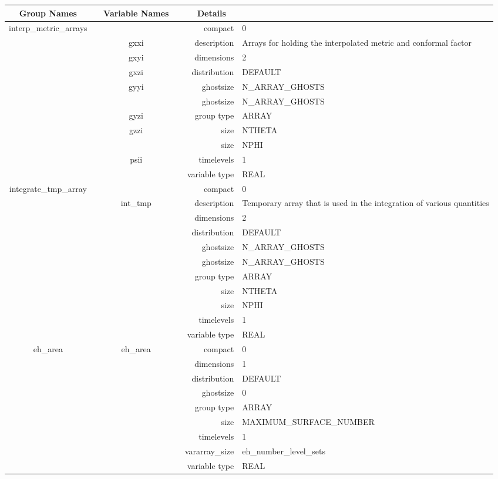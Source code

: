 \begin{tabular*}{150mm}{|c|c@{\extracolsep{\fill}}|rl|} \hline 
~ {\bf Group Names} ~ & ~ {\bf Variable Names} ~  &{\bf Details} ~ & ~ \\ 
\hline 
interp\_metric\_arrays &  & compact & 0 \\ 
 & gxxi & description & Arrays for holding the interpolated metric and conformal factor \\ 
 & gxyi & dimensions & 2 \\ 
 & gxzi & distribution & DEFAULT \\ 
 & gyyi & ghostsize & N\_ARRAY\_GHOSTS \\ 
& ~ & ghostsize & N\_ARRAY\_GHOSTS \\ 
 & gyzi & group type & ARRAY \\ 
 & gzzi & size & NTHETA \\ 
& ~ & size & NPHI \\ 
 & psii & timelevels & 1 \\ 
 &  & variable type & REAL \\ 
\hline 
integrate\_tmp\_array &  & compact & 0 \\ 
 & int\_tmp & description & Temporary array that is used in the integration of various quantities \\ 
 &  & dimensions & 2 \\ 
 &  & distribution & DEFAULT \\ 
 &  & ghostsize & N\_ARRAY\_GHOSTS \\ 
& ~ & ghostsize & N\_ARRAY\_GHOSTS \\ 
 &  & group type & ARRAY \\ 
 &  & size & NTHETA \\ 
& ~ & size & NPHI \\ 
 &  & timelevels & 1 \\ 
 &  & variable type & REAL \\ 
\hline 
eh\_area & eh\_area & compact & 0 \\ 
 &  & dimensions & 1 \\ 
 &  & distribution & DEFAULT \\ 
 &  & ghostsize & 0 \\ 
 &  & group type & ARRAY \\ 
 &  & size & MAXIMUM\_SURFACE\_NUMBER \\ 
 &  & timelevels & 1 \\ 
 &  & vararray\_size & eh\_number\_level\_sets \\ 
 &  & variable type & REAL \\ 

\end{tabular*}
